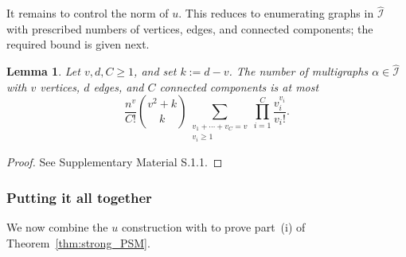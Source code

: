 \documentclass[11pt, letterpaper]{article}
\newtheorem{lemma}[theorem]{Lemma}
\numberwithin{equation}{section}
\newcommand{\goodI}{\widehat{\mathcal{I}}}
\begin{document}
It remains to control the norm of $u$. This reduces to enumerating graphs in
$\goodI$ with prescribed numbers of vertices, edges, and connected components; the required bound is given next.


\begin{lemma}\label{lemma:nr-multigraphs}
  Let \(v,d,C\ge 1\), and set \(k:=d-v\). The number of multigraphs $\alpha\in\widehat{\mathcal I}$ with $v$ vertices, $d$ edges, and $C$ connected components is at most
    \begin{equation*}
\frac{ n^v}{C!}  \binom{ v^2+k}{k}
\sum_{\substack{v_1+\cdots+v_C=v \\ v_i \ge 1}}
\prod_{i=1}^C
\frac{v_i^{ v_i}}{v_i!}.
\end{equation*}
\end{lemma}
\begin{proof}
    See Supplementary Material S.1.1.
\end{proof}
\subsubsection*{Putting it all together}
We now combine the $u$ construction with  to prove part~(i) of Theorem~\ref{thm:strong_PSM}.
\end{document}
